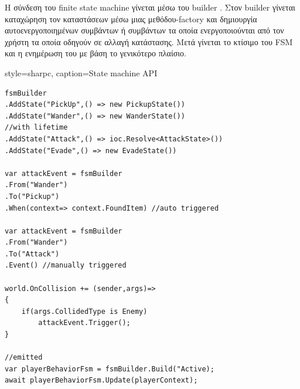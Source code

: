 H σύνδεση του finite state machine γίνεται μέσω του builder \cite{Gamma:1995:DPE:186897}. Στον builder γίνεται καταχώρηση τον καταστάσεων μέσω μιας μεθόδου-factory και δημιουργία αυτοενεργοποιημένων συμβάντων ή συμβάντων τα οποία ενεργοποιούνται από τον χρήστη τα οποία οδηγούν σε αλλαγή κατάστασης. Μετά γίνεται το κτίσιμο του FSM και η ενημέρωση του με βάση το γενικότερο πλαίσιο.

\newpage
\lstset
{
	style=sharpc, 
	caption={State machine API}
}
\begin{lstlisting}	
fsmBuilder
.AddState("PickUp",() => new PickupState())
.AddState("Wander",() => new WanderState())
//with lifetime
.AddState("Attack",() => ioc.Resolve<AttackState>())
.AddState("Evade",() => new EvadeState())	
		
var attackEvent = fsmBuilder
.From("Wander")
.To("Pickup")
.When(context=> context.FoundItem) //auto triggered
	
var attackEvent = fsmBuilder
.From("Wander")
.To("Attack")
.Event() //manually triggered
	 	
world.OnCollision += (sender,args)=>
{
    if(args.CollidedType is Enemy)
	    attackEvent.Trigger();
}
	 
//emitted	 
var playerBehaviorFsm = fsmBuilder.Build("Active);
await playerBehaviorFsm.Update(playerContext);
	
\end{lstlisting}
